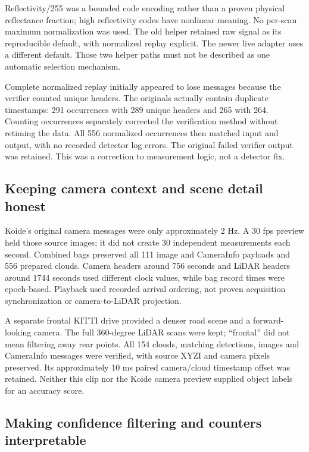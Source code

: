 \documentclass[11pt,a4paper]{article}
\begin{document}
Reflectivity/255 was a bounded code encoding rather than a proven physical reflectance fraction; high reflectivity codes have nonlinear meaning. No per-scan maximum normalization was used. The old helper retained raw signal as its reproducible default, with normalized replay explicit. The newer live adapter uses a different default. Those two helper paths must not be described as one automatic selection mechanism.

Complete normalized replay initially appeared to lose messages because the verifier counted unique headers. The originals actually contain duplicate timestamps: 291 occurrences with 289 unique headers and 265 with 264. Counting occurrences separately corrected the verification method without retiming the data. All 556 normalized occurrences then matched input and output, with no recorded detector log errors. The original failed verifier output was retained. This was a correction to measurement logic, not a detector fix.

\subsection{Keeping camera context and scene detail honest}

Koide's original camera messages were only approximately 2 Hz. A 30 fps preview held those source images; it did not create 30 independent measurements each second. Combined bags preserved all 111 image and CameraInfo payloads and 556 prepared clouds. Camera headers around 756 seconds and LiDAR headers around 1744 seconds used different clock values, while bag record times were epoch-based. Playback used recorded arrival ordering, not proven acquisition synchronization or camera-to-LiDAR projection.

A separate frontal KITTI drive provided a denser road scene and a forward-looking camera. The full 360-degree LiDAR scans were kept; “frontal” did not mean filtering away rear points. All 154 clouds, matching detections, images and CameraInfo messages were verified, with source XYZI and camera pixels preserved. Its approximately 10 ms paired camera/cloud timestamp offset was retained. Neither this clip nor the Koide camera preview supplied object labels for an accuracy score.

\subsection{Making confidence filtering and counters interpretable}
\end{document}
